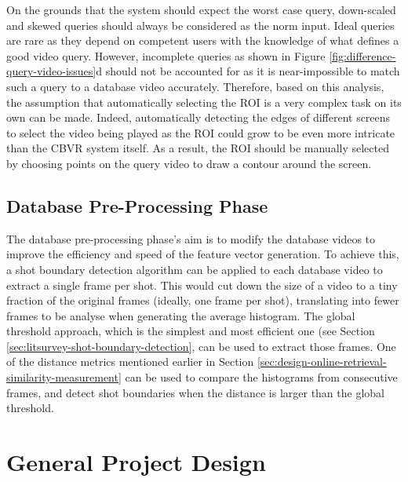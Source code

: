 On the grounds that the system should expect the worst case query, down-scaled and skewed queries should always be considered as the norm input. Ideal queries are rare as they depend on competent users with the knowledge of what defines a good video query. However, incomplete queries as shown in Figure \ref{fig:difference-query-video-issues}d should not be accounted for as it is near-impossible to match such a query to a database video accurately. Therefore, based on this analysis, the assumption that automatically selecting the ROI is a very complex task on its own can be made. Indeed, automatically detecting the edges of different screens to select the video being played as the ROI could grow to be even more intricate than the CBVR system itself. As a result, the ROI should be manually selected by choosing points on the query video to draw a contour around the screen. 


\subsection{Database Pre-Processing Phase}

The database pre-processing phase's aim is to modify the database videos to improve the efficiency and speed of the feature vector generation. To achieve this, a shot boundary detection algorithm can be applied to each database video to extract a single frame per shot. This would cut down the size of a video to a tiny fraction of the original frames (ideally, one frame per shot), translating into fewer frames to be analyse when generating the average histogram. The global threshold approach, which is the simplest and most efficient one (see Section \ref{sec:litsurvey-shot-boundary-detection}, can be used to extract those frames. One of the distance metrics mentioned earlier in Section \ref{sec:design-online-retrieval-similarity-measurement} can be used to compare the histograms from consecutive frames, and detect shot boundaries when the distance is larger than the global threshold.


\section{General Project Design}

